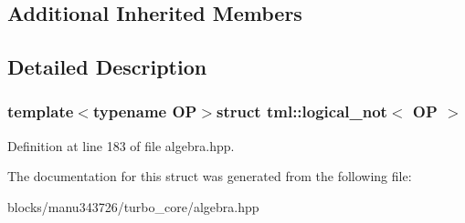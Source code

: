 \subsection*{Additional Inherited Members}


\subsection{Detailed Description}
\subsubsection*{template$<$typename O\+P$>$struct tml\+::logical\+\_\+not$<$ O\+P $>$}



Definition at line 183 of file algebra.\+hpp.



The documentation for this struct was generated from the following file\+:\begin{DoxyCompactItemize}
\item 
blocks/manu343726/turbo\+\_\+core/algebra.\+hpp\end{DoxyCompactItemize}
